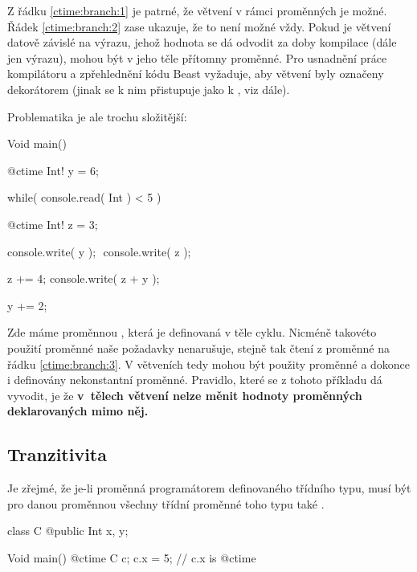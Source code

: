 Z řádku \ref{ctime:branch:1} je patrné, že větvení v rámci \ctime proměnných je možné. Řádek \ref{ctime:branch:2} zase ukazuje, že to není možné vždy. Pokud je větvení datově závislé na výrazu, jehož hodnota se dá odvodit za doby kompilace (dále jen \ctime výrazu), mohou být v jeho těle přítomny \ctime proměnné. Pro usnadnění práce kompilátoru a zpřehlednění kódu Beast vyžaduje, aby \ctime větvení byly označeny dekorátorem (jinak se k nim přistupuje jako k \nonctime, viz dále).

Problematika je ale trochu složitější:

\begin{code}
Void main() {
	@ctime Int! y = 6;

	while( console.read( Int ) < 5 ) {
		@ctime Int! z = 3;
				
		console.write( y );	$\label{ctime:branch:3}$
		console.write( z );
		
		z += 4;
		console.write( z + y );
		
		y += 2;
	}
}
\end{code}

Zde máme proměnnou , která je definovaná v těle \nonctime cyklu. Nicméně takovéto použití proměnné naše požadavky nenarušuje, stejně tak čtení z proměnné  na řádku \ref{ctime:branch:3}. V \nonctime větveních tedy mohou být použity \ctime proměnné a dokonce i definovány nekonstantní \ctime proměnné. Pravidlo, které se z tohoto příkladu dá vyvodit, je že \textbf{v~tělech \nonctime větvení nelze měnit hodnoty \ctime proměnných deklarovaných mimo něj.}

\subsection{Tranzitivita \ctime}
Je zřejmé, že je-li proměnná \ctime programátorem definovaného třídního typu, musí být pro danou proměnnou všechny třídní proměnné toho typu také \ctime.

\begin{code}
class C {
	@public Int x, y;
}

Void main() {
	@ctime C c;
	c.x = 5; // c.x is @ctime
}
\end{code}

